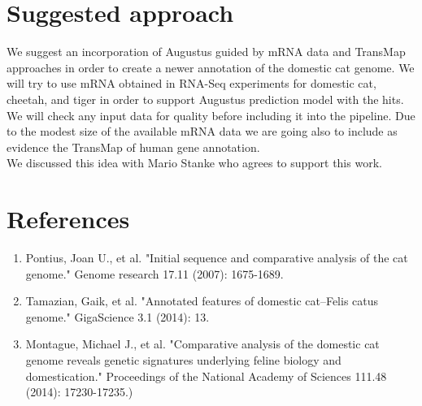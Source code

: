 \documentclass{article}
\begin{document}
\section{Suggested approach}
We suggest an incorporation of Augustus guided by mRNA data and TransMap approaches in order to create a newer annotation of the domestic cat genome.
We will try to use mRNA obtained in RNA-Seq experiments for domestic cat, cheetah, and tiger in order to support Augustus prediction model with the hits. We will check any input data for quality before including it into the pipeline. Due to the modest size of the available mRNA data we are going also to include as evidence the TransMap of human gene annotation.\\
We discussed this idea with Mario Stanke who agrees to support this work. 

\section{References}

\begin{enumerate}
\item Pontius, Joan U., et al. "Initial sequence and comparative analysis of the cat genome." Genome research 17.11 (2007): 1675-1689.
\item Tamazian, Gaik, et al. "Annotated features of domestic cat–Felis catus genome." GigaScience 3.1 (2014): 13.
\item Montague, Michael J., et al. "Comparative analysis of the domestic cat genome reveals genetic signatures underlying feline biology and domestication." Proceedings of the National Academy of Sciences 111.48 (2014): 17230-17235.)
\end{enumerate}
\end{document}
